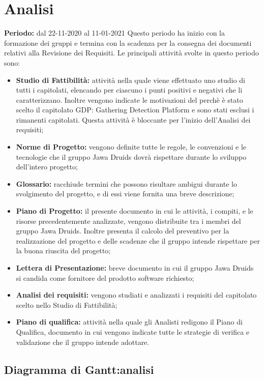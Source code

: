 \section{Analisi}\label{4.1}
\textbf{Periodo:} dal 22-11-2020 al 11-01-2021
Questo periodo ha inizio con la formazione dei gruppi e termina con la scadenza per la consegna dei documenti relativi alla Revisione dei Requisiti.
Le principali attività svolte in questo periodo sono:
\begin{itemize}
	\item \textbf{Studio di Fattibilità:} attività nella quale viene effettuato uno studio di tutti i capitolati, elencando per ciascuno i punti positivi e negativi che li caratterizzano. Inoltre vengono indicate le motivazioni del perchè è stato scelto il capitolato GDP: Gathering Detection Platform e sono stati esclusi i rimanenti capitolati.
	Questa attività è bloccante per l'inizio dell'Analisi dei requisiti;
	\item \textbf{Norme di Progetto:} vengono definite tutte le regole, le convenzioni e le tecnologie che il gruppo Jawa Druids dovrà rispettare durante lo sviluppo dell'intero progetto;
	\item \textbf{Glossario:} racchiude termini che possono risultare ambigui durante lo svolgimento del progetto, e di essi viene fornita una breve descrizione;
	\item \textbf{Piano di Progetto:} il presente documento in cui le attività, i compiti, e le risorse precedentemente analizzate, vengono distribuite tra i membri del gruppo Jawa Druids. Inoltre presenta il calcolo del preventivo per la realizzazione del progetto e delle scadenze che il gruppo intende rispettare per la buona riuscita del progetto;
	\item \textbf{Lettera di Presentazione:} breve documento in cui il gruppo Jawa Druids si candida come fornitore del prodotto software richiesto;
	\item \textbf{Analisi dei requisiti:} vengono studiati e analizzati i requisiti del capitolato scelto nello Studio di Fattibilità;
	\item \textbf{Piano di qualifica:} attività nella quale gli Analisti redigono il Piano di Qualifica, documento in cui vengono indicate tutte le strategie di verifica e validazione che il gruppo intende adottare.
\end{itemize}
\subsection{Diagramma di Gantt:analisi}\label{4.1.1}


